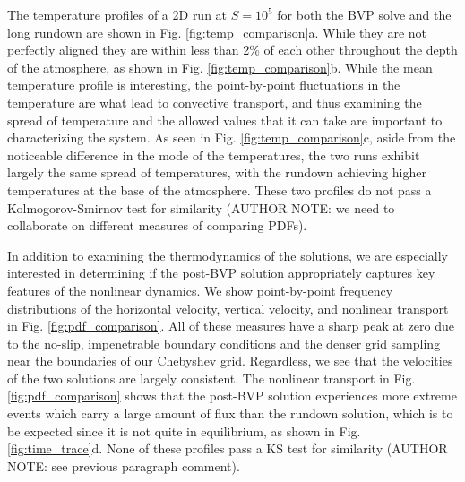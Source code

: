 \documentclass[aps, pre, onecolumn, nofootinbib, notitlepage, groupedaddress, amsfonts, amssymb, amsmath, longbibliography]{revtex4-1}
\begin{document}
The temperature profiles of a 2D run at $S = 10^5$ 
for both the BVP solve and the long rundown are shown in
Fig. \ref{fig:temp_comparison}a.  While they are not perfectly aligned they are within less than
2\% of each other throughout the depth of the atmosphere, as shown in Fig. \ref{fig:temp_comparison}b.
While the mean temperature profile is interesting, the point-by-point fluctuations in the
temperature are what lead to convective transport, and thus examining the spread of temperature
and the allowed values that it can take are important to characterizing the system.  As seen
in Fig. \ref{fig:temp_comparison}c, aside from the noticeable difference in the mode of the
temperatures, the two runs exhibit largely the same spread of temperatures, with the rundown
achieving higher temperatures at the base of the atmosphere.  These two profiles do not pass
a Kolmogorov-Smirnov test for similarity (AUTHOR NOTE: we need to collaborate on different measures
of comparing PDFs).

In addition to examining the thermodynamics of the solutions, we are especially interested in
determining if the post-BVP solution appropriately captures key features of the nonlinear dynamics.
We show point-by-point frequency distributions of the horizontal velocity, vertical velocity,
and nonlinear transport in Fig. \ref{fig:pdf_comparison}.  All of these measures have a sharp
peak at zero due to the no-slip, impenetrable boundary conditions and the denser grid sampling
near the boundaries of our Chebyshev grid.  Regardless, we see that the velocities of the 
two solutions are largely consistent.  The nonlinear transport in Fig. \ref{fig:pdf_comparison}
shows that the post-BVP solution experiences more extreme events which carry a large amount of
flux than the rundown solution, which is to be expected since it is not quite in equilibrium,
as shown in Fig. \ref{fig:time_trace}d.  None of these profiles pass a KS test for similarity
(AUTHOR NOTE: see previous paragraph comment).
\end{document}

